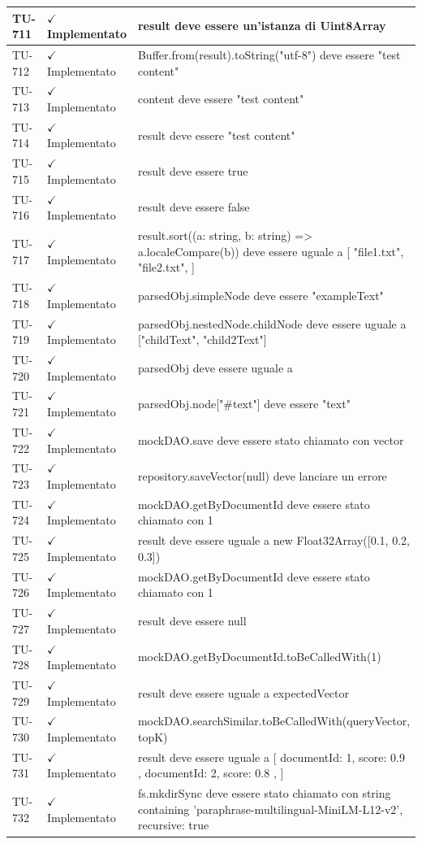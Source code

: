 ﻿\documentclass[a4paper,12pt]{article}
\newcommand{\ok}{\textcolor{green!60!black}{$\checkmark$ Implementato}}
\begin{document}
\begin{longtable}{|p{2cm}|p{3.5cm}|p{9.5cm}|}
\hline
TU-711 & \ok & result deve essere un'istanza di Uint8Array \\
\hline
TU-712 & \ok & Buffer.from(result).toString("utf-8") deve essere "test content" \\
\hline
TU-713 & \ok & content deve essere "test content" \\
\hline
TU-714 & \ok & result deve essere "test content" \\
\hline
TU-715 & \ok & result deve essere true \\
\hline
TU-716 & \ok & result deve essere false \\
\hline
TU-717 & \ok & result.sort((a: string, b: string) => a.localeCompare(b)) deve essere uguale a [ "file1.txt", "file2.txt", ] \\
\hline
TU-718 & \ok & parsedObj.simpleNode deve essere "exampleText" \\
\hline
TU-719 & \ok & parsedObj.nestedNode.childNode deve essere uguale a ["childText", "child2Text"] \\
\hline
TU-720 & \ok & parsedObj deve essere uguale a {} \\
\hline
TU-721 & \ok & parsedObj.node["\#text"] deve essere "text" \\
\hline
TU-722 & \ok & mockDAO.save deve essere stato chiamato con vector \\
\hline
TU-723 & \ok & repository.saveVector(null) deve lanciare un errore \\
\hline
TU-724 & \ok & mockDAO.getByDocumentId deve essere stato chiamato con 1 \\
\hline
TU-725 & \ok & result deve essere uguale a new Float32Array([0.1, 0.2, 0.3]) \\
\hline
TU-726 & \ok & mockDAO.getByDocumentId deve essere stato chiamato con 1 \\
\hline
TU-727 & \ok & result deve essere null \\
\hline
TU-728 & \ok & mockDAO.getByDocumentId.toBeCalledWith(1) \\
\hline
TU-729 & \ok & result deve essere uguale a expectedVector \\
\hline
TU-730 & \ok & mockDAO.searchSimilar.toBeCalledWith(queryVector, topK) \\
\hline
TU-731 & \ok & result deve essere uguale a [ { documentId: 1, score: 0.9 }, { documentId: 2, score: 0.8 }, ] \\
\hline
TU-732 & \ok & fs.mkdirSync deve essere stato chiamato con string containing 'paraphrase-multilingual-MiniLM-L12-v2', { recursive: true } \\

\end{longtable}
\end{document}
